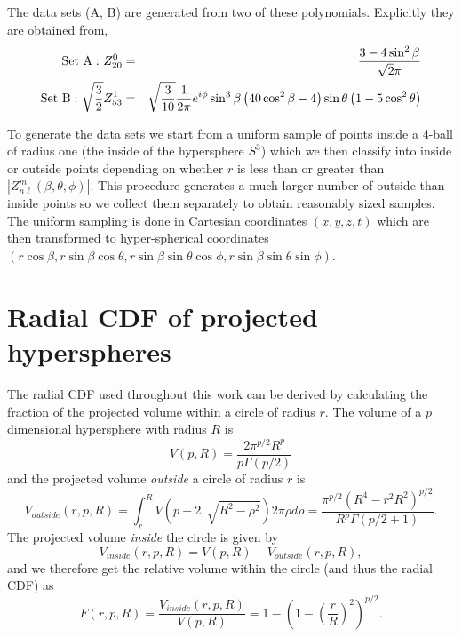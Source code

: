 \documentclass[
]{article}
\begin{document}
The data sets (A, B) are generated from two of these polynomials.
Explicitly they are obtained from, \begin{eqnarray}
{\rm Set~A:}~Z^0_{20} &=& \frac{3-4\sin^2\beta}{\sqrt{2}\pi} \nonumber \\
{\rm Set~B:}~\sqrt{\frac{3}{2}}Z^1_{53} &=& \sqrt{\frac{3}{10}}\frac{1}{2\pi} e^{i\phi}\sin^3\beta\left(40\cos^2\beta-4\right)\sin\theta\left(1-5\cos^2\theta\right)
\end{eqnarray}

To generate the data sets we start from a uniform sample of points
inside a 4-ball of radius one (the inside of the hypersphere \(S^3\))
which we then classify into inside or outside points depending on
whether \(r\) is less than or greater than
\(|Z^m_{n\ell}(\beta,\theta,\phi)|\). This procedure generates a much
larger number of outside than inside points so we collect them
separately to obtain reasonably sized samples. The uniform sampling is
done in Cartesian coordinates \((x,y,z,t)\) which are then transformed
to hyper-spherical coordinates
\((r\cos\beta,r\sin\beta\cos\theta,r\sin\beta\sin\theta\cos\phi,r\sin\beta\sin\theta\sin\phi)\).

\hypertarget{radial-cdf-of-projected-hyperspheres}{%
\section{Radial CDF of projected
hyperspheres}\label{radial-cdf-of-projected-hyperspheres}}

The radial CDF used throughout this work can be derived by calculating
the fraction of the projected volume within a circle of radius \(r\).
The volume of a \(p\) dimensional hypersphere with radius \(R\) is
\begin{equation}
V(p, R) = \frac{2 \pi^{p/2} R^p} {p \Gamma(p/2)}
\end{equation} and the projected volume \textit{outside} a circle of
radius \(r\) is \begin{equation}
V_{outside} (r, p, R) = \int_r^R V(p-2, \sqrt{R^2 - \rho^2}) 2 \pi \rho d\rho =
\frac{\pi^{p/2}(R^4 - r^2 R^2)^{p/2}}{R^p \Gamma(p/2+1)}.
\end{equation} The projected volume \textit{inside} the circle is given
by \begin{equation}
V_{inside}(r, p, R) = V(p, R) - V_{outside}(r, p, R),
\end{equation} and we therefore get the relative volume within the
circle (and thus the radial CDF) as \begin{equation}
F (r, p, R) = \frac{V_{inside}(r, p, R)}{V(p, R)} = 1 - \left(1-\left(\frac{r}{R}\right)^2\right)^{p/2}.
\end{equation}
\end{document}
